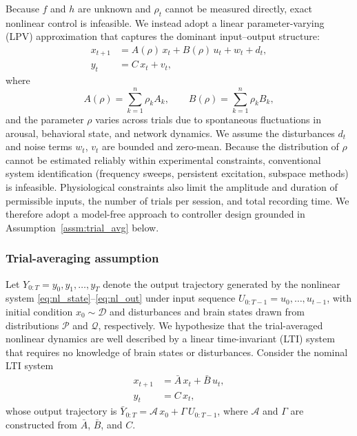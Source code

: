 Because $f$ and $h$ are unknown and $\rho_{t}$ cannot be measured
directly, exact nonlinear control is infeasible. We instead adopt a
linear parameter-varying (LPV) approximation that captures the dominant
input--output structure:
%
\begin{align}
    x_{t+1} &= A(\rho)\,x_{t} + B(\rho)\,u_{t} + w_{t} + d_{t},
               \label{eq:lpv_state} \\
    y_{t}   &= C\,x_{t} + v_{t},
               \label{eq:lpv_out}
\end{align}
%
where
\begin{equation*}
    A(\rho) = \sum_{k=1}^{n} \rho_{k} A_{k}, \qquad
    B(\rho) = \sum_{k=1}^{n} \rho_{k} B_{k},
\end{equation*}
and the parameter $\rho$ varies across trials due to spontaneous
fluctuations in arousal, behavioral state, and network dynamics. We
assume the disturbances $d_{t}$ and noise terms $w_{t}$, $v_{t}$ are
bounded and zero-mean. Because the distribution of $\rho$ cannot be
estimated reliably within experimental constraints, conventional system
identification (frequency sweeps, persistent excitation, subspace
methods) is infeasible. Physiological constraints also limit the
amplitude and duration of permissible inputs, the number of trials per
session, and total recording time. We therefore adopt a model-free
approach to controller design grounded in Assumption~\ref{assm:trial_avg}
below.

\subsubsection*{Trial-averaging assumption}

Let $Y_{0:T} = y_{0}, y_{1}, \ldots, y_{T}$ denote the output
trajectory generated by the nonlinear system
\eqref{eq:nl_state}--\eqref{eq:nl_out} under input sequence
$U_{0:T-1} = u_{0}, \ldots, u_{t-1}$, with initial condition $x_{0}
\sim \mathcal{D}$ and disturbances and brain states drawn from
distributions $\mathcal{P}$ and $\mathcal{Q}$, respectively. We
hypothesize that the trial-averaged nonlinear dynamics are well
described by a linear time-invariant (LTI) system that requires no
knowledge of brain states or disturbances. Consider the nominal LTI
system
%
\begin{align}
    x_{t+1} &= \bar{A}\,x_{t} + \bar{B}\,u_{t}, \label{eq:lti_state}\\
    y_{t}   &= C\,x_{t},                          \label{eq:lti_out}
\end{align}
%
whose output trajectory is $\bar{Y}_{0:T} = \mathcal{A}\,x_{0} +
\Gamma\,U_{0:T-1}$, where $\mathcal{A}$ and $\Gamma$ are constructed
from $\bar{A}$, $\bar{B}$, and $C$.

